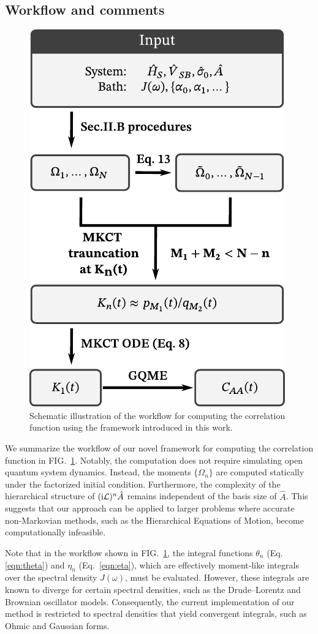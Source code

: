 \documentclass[preprint,aip,jcp]{revtex4-2}
\newcommand{\im}{\textup{i}}
\newcommand{\Lv}{\mathcal{L}}
\begin{document}
\subsection{Workflow and comments\label{subsec:theory_comments}}
\begin{figure}[htbp]
    \centering
    \includegraphics[width=0.4\linewidth]{figs/workflow.pdf}
    \caption{Schematic illustration of the workflow for computing the correlation function using the framework introduced in this work.}
    \label{fig:workflow}
\end{figure}
We summarize the workflow of our novel framework for computing the correlation function in FIG.~\ref{fig:workflow}. Notably, the computation does not require simulating open quantum system dynamics. Instead, the moments $\{\Omega_n\}$ are computed statically under the factorized initial condition. Furthermore, the complexity of the hierarchical structure of $(\im\Lv)^n \hat{A}$ remains independent of the basis size of $\hat{A}$. This suggests that our approach can be applied to larger problems where accurate non-Markovian methods, such as the Hierarchical Equations of Motion, become computationally infeasible.

Note that in the workflow shown in FIG.~\ref{fig:workflow}, the integral functions $\theta_n$ (Eq.\ref{eqn:theta}) and $\eta_n$ (Eq.~\ref{eqn:eta}), which are effectively moment-like integrals over the spectral density $J(\omega)$, must be evaluated. However, these integrals are known to diverge for certain spectral densities, such as the Drude–Lorentz and Brownian oscillator models. Consequently, the current implementation of our method is restricted to spectral densities that yield convergent integrals, such as Ohmic and Gaussian forms.
\end{document}
